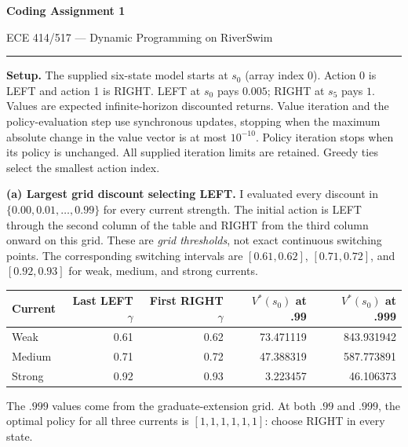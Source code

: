 \documentclass[11pt]{article}
\begin{document}
{\LARGE\bfseries\color{navy} Coding Assignment 1}\par
{\large ECE 414/517 --- Dynamic Programming on RiverSwim}\par
\vspace{2pt}\hrule\vspace{6pt}
\textbf{Setup.} The supplied six-state model starts at $s_0$ (array index 0).
Action 0 is LEFT and action 1 is RIGHT. LEFT at $s_0$ pays $0.005$;
RIGHT at $s_5$ pays $1$. Values are expected infinite-horizon discounted
returns. Value iteration and the policy-evaluation step use synchronous
updates, stopping when the maximum absolute change in the value vector is
at most $10^{-10}$. Policy iteration stops when its policy is unchanged.
All supplied iteration limits are retained. Greedy ties select the smallest action index.

\textbf{(a) Largest grid discount selecting LEFT.}
I evaluated every discount in
$\{0.00,0.01,\ldots,0.99\}$ for every current strength.
The initial action is LEFT through the second column of the table and
RIGHT from the third column onward on this grid.
These are \emph{grid thresholds}, not exact continuous switching points.
The corresponding switching intervals are $[0.61,0.62]$, $[0.71,0.72]$,
and $[0.92,0.93]$ for weak, medium, and strong currents.
\begin{center}
\begin{tabular}{lrrrr}
\toprule
Current & Last LEFT $\gamma$ & First RIGHT $\gamma$ & $V^*(s_0)$ at .99 & $V^*(s_0)$ at .999\\
\midrule
Weak & 0.61 & 0.62 & 73.471119 & 843.931942 \\
Medium & 0.71 & 0.72 & 47.388319 & 587.773891 \\
Strong & 0.92 & 0.93 & 3.223457 & 46.106373 \\
\bottomrule
\end{tabular}
\end{center}
The $.999$ values come from the graduate-extension grid. At both $.99$
and $.999$, the optimal policy for all three currents is
$[1,1,1,1,1,1]$: choose RIGHT in every state.
\end{document}
